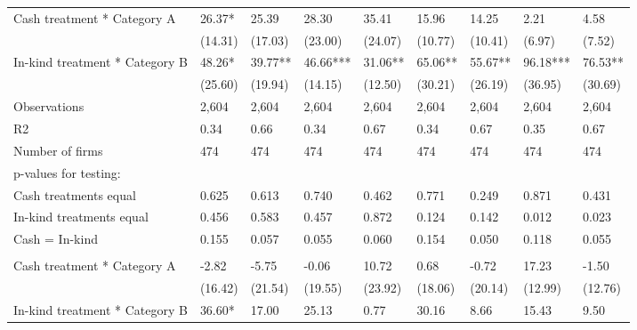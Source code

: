 \begin{table}[H]
{\begin{tabular}{lllllllll}
\hspace{1em}Cash treatment * Category A & 26.37* & 25.39 & 28.30 & 35.41 & 15.96 & 14.25 & 2.21 & 4.58\\
\hspace{1em} & (14.31) & (17.03) & (23.00) & (24.07) & (10.77) & (10.41) & (6.97) & (7.52)\\
\hspace{1em}In-kind treatment * Category B & 48.26* & 39.77** & 46.66*** & 31.06** & 65.06** & 55.67** & 96.18*** & 76.53**\\
\hspace{1em} & (25.60) & (19.94) & (14.15) & (12.50) & (30.21) & (26.19) & (36.95) & (30.69)\\
\hspace{1em}Observations & 2,604 & 2,604 & 2,604 & 2,604 & 2,604 & 2,604 & 2,604 & 2,604\\
\hspace{1em}R2 & 0.34 & 0.66 & 0.34 & 0.67 & 0.34 & 0.67 & 0.35 & 0.67\\
\hspace{1em}Number of firms & 474 & 474 & 474 & 474 & 474 & 474 & 474 & 474\\
\hspace{1em}p-values for testing: &  &  &  &  &  &  &  \vphantom{1}& \\
\hspace{1em}\hspace{1em} Cash treatments equal & 0.625 & 0.613 & 0.740 & 0.462 & 0.771 & 0.249 & 0.871 & 0.431\\
\hspace{1em}\hspace{1em} In-kind treatments equal & 0.456 & 0.583 & 0.457 & 0.872 & 0.124 & 0.142 & 0.012 & 0.023\\
\hspace{1em}\hspace{1em} Cash = In-kind & 0.155 & 0.057 & 0.055 & 0.060 & 0.154 & 0.050 & 0.118 & 0.055\\
\addlinespace[0.3em]
\multicolumn{9}{l}{\textbf{Panel B: Males}}\\
\hspace{1em}Cash treatment * Category A & -2.82 & -5.75 & -0.06 & 10.72 & 0.68 & -0.72 & 17.23 & -1.50\\
\hspace{1em} & (16.42) & (21.54) & (19.55) & (23.92) & (18.06) & (20.14) & (12.99) & (12.76)\\
\hspace{1em}In-kind treatment * Category B & 36.60* & 17.00 & 25.13 & 0.77 & 30.16 & 8.66 & 15.43 & 9.50\\

\end{tabular}}
\end{table}
